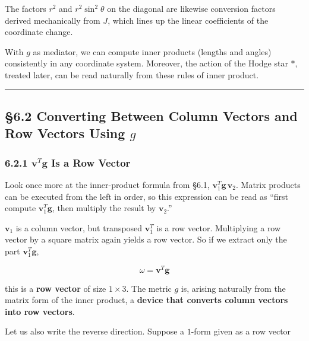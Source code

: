 The factors \(r^2\) and \(r^2\sin^2\theta\) on the diagonal are likewise
conversion factors derived mechanically from \(J\), which lines up the
linear coefficients of the coordinate change.

With \(g\) as mediator, we can compute inner products (lengths and
angles) consistently in any coordinate system. Moreover, the action of
the Hodge star \(\ast\), treated later, can be read naturally from these
rules of inner product.

\begin{center}\rule{0.5\linewidth}{0.5pt}\end{center}

\hypertarget{converting-between-column-vectors-and-row-vectors-using-g}{%
\subsection{\texorpdfstring{§6.2 Converting Between Column Vectors and
Row Vectors Using
\(g\)}{§6.2 Converting Between Column Vectors and Row Vectors Using g}}\label{converting-between-column-vectors-and-row-vectors-using-g}}

\hypertarget{mathbfvt-mathbfg-is-a-row-vector}{%
\subsubsection{\texorpdfstring{6.2.1 \(\mathbf{v}^T \mathbf{g}\) Is a
Row
Vector}{6.2.1 \textbackslash mathbf\{v\}\^{}T \textbackslash mathbf\{g\} Is a Row Vector}}\label{mathbfvt-mathbfg-is-a-row-vector}}

Look once more at the inner-product formula from §6.1,
\(\mathbf{v}_1^T \mathbf{g} \,\mathbf{v}_2\). Matrix products can be
executed from the left in order, so this expression can be read as
``first compute \(\mathbf{v}_1^T \mathbf{g}\), then multiply the result
by \(\mathbf{v}_2\).''

\(\mathbf{v}_1\) is a column vector, but transposed \(\mathbf{v}_1^T\)
is a row vector. Multiplying a row vector by a square matrix again
yields a row vector. So if we extract only the part
\(\mathbf{v}_1^T \mathbf{g}\),

\[\omega = \mathbf{v}^T \mathbf{g}\]

this is a \textbf{row vector} of size \(1 \times 3\). The metric \(g\)
is, arising naturally from the matrix form of the inner product, a
\textbf{device that converts column vectors into row vectors}.

Let us also write the reverse direction. Suppose a \(1\)-form given as a
row vector

